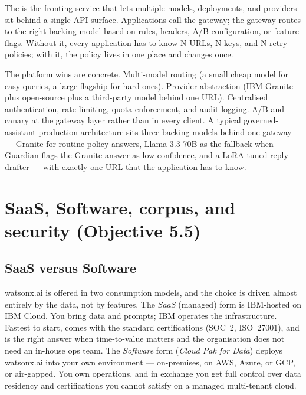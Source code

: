 The  is the fronting service that lets multiple models, deployments, and providers sit behind a single API surface. Applications call the gateway; the gateway routes to the right backing model based on rules, headers, A/B configuration, or feature flags. Without it, every application has to know N URLs, N keys, and N retry policies; with it, the policy lives in one place and changes once.

The platform wins are concrete. Multi-model routing (a small cheap model for easy queries, a large flagship for hard ones). Provider abstraction (IBM Granite plus open-source plus a third-party model behind one URL). Centralised authentication, rate-limiting, quota enforcement, and audit logging. A/B and canary at the gateway layer rather than in every client. A typical governed-assistant production architecture sits three backing models behind one gateway --- Granite for routine policy answers, Llama-3.3-70B as the fallback when Guardian flags the Granite answer as low-confidence, and a LoRA-tuned reply drafter --- with exactly one URL that the application has to know.

\section{SaaS, Software, corpus, and security (Objective 5.5)}

\subsection{SaaS versus Software}

watsonx.ai is offered in two consumption models, and the choice is driven almost entirely by the data, not by features. The \emph{SaaS} (managed) form is IBM-hosted on IBM Cloud. You bring data and prompts; IBM operates the infrastructure. Fastest to start, comes with the standard certifications (SOC~2, ISO~27001), and is the right answer when time-to-value matters and the organisation does not need an in-house ops team. The \emph{Software} form (\emph{Cloud Pak for Data}) deploys watsonx.ai into your own environment --- on-premises, on AWS, Azure, or GCP, or air-gapped. You own operations, and in exchange you get full control over data residency and certifications you cannot satisfy on a managed multi-tenant cloud.


